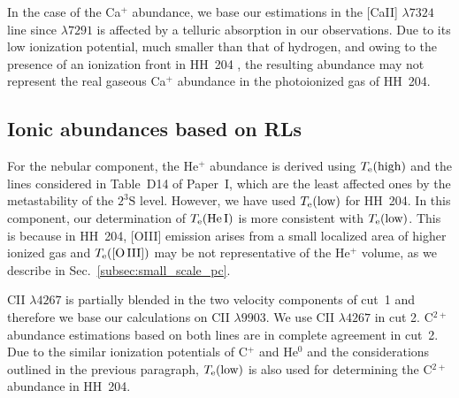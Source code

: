 \documentclass[twocolumn,linenumbers]{aastex63}
\newcommand{\eduardo}[1]{{\color{teal}E: #1}}
\newcommand{\jorge}[1]{{\color{magenta}J: #1}}
\begin{document}
In the case of the Ca$^{+}$ abundance, we base our estimations in the [Ca\thinspace II] $\lambda 7324$ line since $\lambda 7291$ is affected by a telluric absorption in our observations. Due to its low ionization potential, much smaller than that of hydrogen, and owing to the presence of an ionization front in HH~204 \citep{nunezdiaz12}, the resulting abundance may not represent the real gaseous Ca$^{+}$ abundance in the photoionized gas of HH~204.


\subsection{Ionic abundances based on RLs}
\label{subsec:ionic_abundances_rls}

For the nebular component,  the He$^{+}$ abundance is derived using $T_{\rm e} (\text{high})$ and the lines considered in Table~D14 of Paper~I, which are the least affected ones by the metastability of the $2^3\text{S}$ level. However, we have used $T_{\rm e} (\text{low})$ for HH~204. In this component, our determination of $T_{\rm e}(\text{He\thinspace I})$ is more consistent with $T_{\rm e} (\text{low})$. This is because in HH~204, [O\thinspace III] emission arises from a small localized area of higher ionized gas and $T_{\rm e} (\text{[O\thinspace III]})$ may be not representative of the He$^{+}$ volume, as we describe in Sec.~\ref{subsec:small_scale_pc}. 

C\thinspace II $\lambda 4267$ is partially blended in the two velocity components of cut~1 and therefore we base our calculations on C\thinspace II $\lambda 9903$. We use C\thinspace II $\lambda 4267$ in cut 2. C$^{2+}$ abundance estimations based on both lines are in complete agreement in cut~2. Due to the similar ionization potentials of C$^{+}$ and He$^{0}$ and the considerations outlined in the previous paragraph, $T_{\rm e}(\text{low})$ is also used for determining the C$^{2+}$ abundance in HH~204.  
\end{document}

